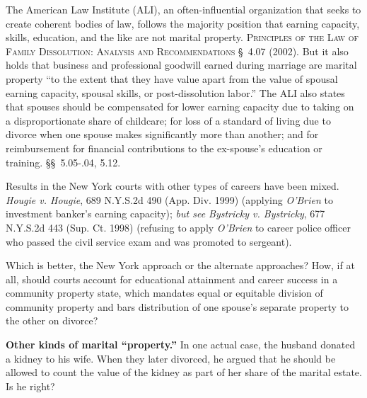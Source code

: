 \item
The American Law Institute (ALI), an often-influential organization that seeks
to create coherent bodies of law, follows the majority position that earning
capacity, skills, education, and the like are not marital property.
\textsc{Principles of the Law of Family Dissolution: Analysis and
Recommendations} \S~4.07 (2002). But it also holds that business and
professional goodwill earned during marriage are marital property ``to the
extent that they have value apart from the value of spousal earning capacity,
spousal skills, or post-dissolution labor.'' The ALI also states that spouses
should be compensated for lower earning capacity due to taking on a
disproportionate share of childcare; for loss of a standard of living due to
divorce when one spouse makes significantly more than another; and for
reimbursement for financial contributions to the ex-spouse's education or
training. \S\S~5.05-.04, 5.12.

Results in the New York courts with other types of careers have been mixed.
\emph{Hougie v. Hougie}, 689 N.Y.S.2d 490 (App. Div. 1999) (applying
\textit{O'Brien} to investment banker's earning capacity); \emph{but see
Bystricky v. Bystricky}, 677 N.Y.S.2d 443 (Sup. Ct. 1998) (refusing to apply
\textit{O'Brien} to career police officer who passed the civil service exam and
was promoted to sergeant).

Which is better, the New York approach or the alternate approaches? How, if at
all, should courts account for educational attainment and career success in a
community property state, which mandates equal or equitable division of
community property and bars distribution of one spouse's separate property to
the other on divorce?

\item
\textbf{Other kinds of marital ``property.''} In one actual case, the husband
donated a kidney to his wife. When they later divorced, he argued that he
should be allowed to count the value of the kidney as part of her share of the
marital estate. Is he right?

